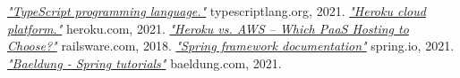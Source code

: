 \documentclass[twoside]{ctuthesis}
\begin{document}
\begin{thebibliography}{99}
        \href{https://www.typescriptlang.org/}{\emph{"TypeScript programming language."}}
        typescriptlang.org, 2021.
        \href{https://www.heroku.com/}{\emph{"Heroku cloud platform."}}
        heroku.com, 2021.
        \href{https://railsware.com/blog/heroku-vs-aws-which-paas-hosting-to-choose/}{\emph{"Heroku vs. AWS – Which PaaS Hosting to Choose?"}}
        railsware.com, 2018.
        \href{https://docs.spring.io/spring-framework/docs/current/reference/html/}{\emph{"Spring framework documentation"}}
        spring.io, 2021.
        \href{https://www.baeldung.com/}{\emph{"Baeldung - Spring tutorials"}}
        baeldung.com, 2021.
    \end{thebibliography}
\end{document}
